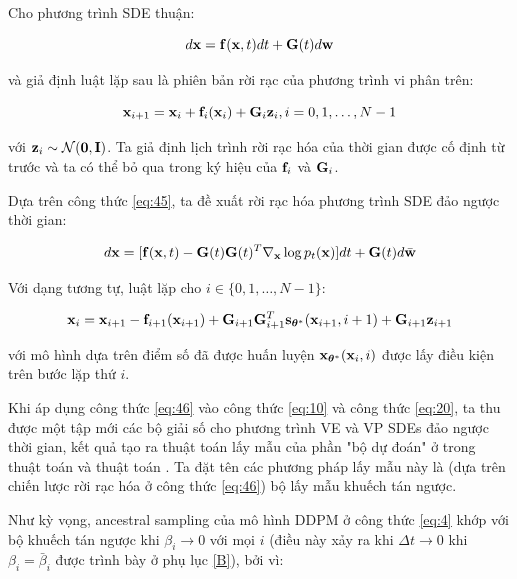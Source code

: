 \documentclass{article} %
\begin{document}
Cho phương trình SDE thuận:

\begin{equation*}
    d \bold{x} = \bold{f}(\bold{x}, t) dt + \bold{G}(t) d \bold{w}
\end{equation*}

và giả định luật lặp sau là phiên bản rời rạc của phương trình vi phân trên:

\begin{equation} \label{eq:45}
    \bold{x}_{i+1} = \bold{x}_i + \bold{f}_i (\bold{x}_i) + \bold{G}_i \bold{z}_i, i = 0, 1, \dots, N - 1
\end{equation}

với $\bold{z}_i \sim \mathcal{N}(\bold{0}, \bold{I})$.
Ta giả định lịch trình rời rạc hóa của thời gian được cố định từ trước và ta có thể bỏ qua trong ký hiệu của $\bold{f}_i$ và $\bold{G}_i$.

Dựa trên công thức \ref{eq:45}, ta đề xuất rời rạc hóa phương trình SDE đảo ngược thời gian:

\begin{equation*}
    d \bold{x} = \lbrack \bold{f}(\bold{x}, t) - \bold{G}(t) \bold{G}(t)^T \nabla_{\bold{x}} \log p_t (\bold{x}) \rbrack dt + \bold{G}(t) d \bar{\bold{w}}
\end{equation*}

Với dạng tương tự, luật lặp cho $i \in \lbrace 0, 1, \dots, N -1 \rbrace$:

\begin{equation} \label{eq:46}
    \bold{x}_i = \bold{x}_{i+1} - \bold{f}_{i+1} (\bold{x}_{i+1}) + \bold{G}_{i+1} \bold{G}_{i+1}^T \bold{s}_{\boldsymbol{\theta}^{\ast}} (\bold{x}_{i+1}, i + 1) + \bold{G}_{i+1} \bold{z}_{i+1}
\end{equation}

với mô hình dựa trên điểm số đã được huấn luyện $\bold{x}_{\boldsymbol{\theta}^{\ast}}(\bold{x}_i, i)$ được lấy điều kiện trên bước lặp thứ $i$.

Khi áp dụng công thức \ref{eq:46} vào công thức \ref{eq:10} và công thức \ref{eq:20}, ta thu được một tập mới các bộ giải số cho phương trình VE và VP SDEs đảo ngược thời gian, kết quả tạo ra thuật toán lấy mẫu của phần "bộ dự đoán" ở trong thuật toán và thuật toán .
Ta đặt tên các phương pháp lấy mẫu này là (dựa trên chiến lược rời rạc hóa ở công thức \ref{eq:46}) bộ lấy mẫu khuếch tán ngược.

Như kỳ vọng, ancestral sampling của mô hình DDPM \citep{ho2020denoising} ở công thức \ref{eq:4} khớp với bộ khuếch tán ngược khi $\beta_i \rightarrow 0$ với mọi $i$ (điều này xảy ra khi $\Delta t \rightarrow 0$ khi $\beta_i = \bar{\beta}_i$ được trình bày ở phụ lục \ref{B}), bởi vì:
\end{document}
